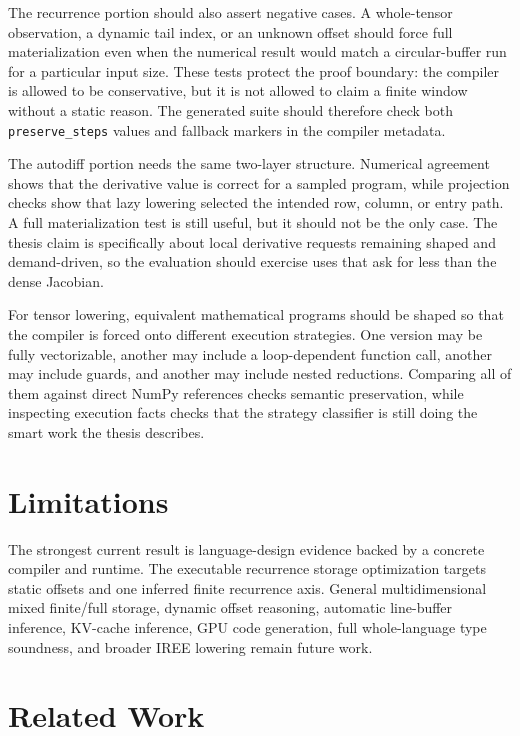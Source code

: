 The recurrence portion should also assert negative cases. A whole-tensor
observation, a dynamic tail index, or an unknown offset should force full
materialization even when the numerical result would match a circular-buffer
run for a particular input size. These tests protect the proof boundary: the
compiler is allowed to be conservative, but it is not allowed to claim a finite
window without a static reason. The generated suite should therefore check both
\texttt{preserve\_steps} values and fallback markers in the compiler metadata.

The autodiff portion needs the same two-layer structure. Numerical agreement
shows that the derivative value is correct for a sampled program, while
projection checks show that lazy lowering selected the intended row, column, or
entry path. A full materialization test is still useful, but it should not be
the only case. The thesis claim is specifically about local derivative requests
remaining shaped and demand-driven, so the evaluation should exercise uses that
ask for less than the dense Jacobian.

For tensor lowering, equivalent mathematical programs should be shaped so that
the compiler is forced onto different execution strategies. One version may be
fully vectorizable, another may include a loop-dependent function call, another
may include guards, and another may include nested reductions. Comparing all of
them against direct NumPy references checks semantic preservation, while
inspecting execution facts checks that the strategy classifier is still doing
the smart work the thesis describes.

\section{Limitations}

The strongest current result is language-design evidence backed by a concrete
compiler and runtime. The executable recurrence storage optimization targets
static offsets and one inferred finite recurrence axis. General
multidimensional mixed finite/full storage, dynamic offset reasoning,
automatic line-buffer inference, KV-cache inference, GPU code generation, full
whole-language type soundness, and broader IREE lowering remain future work.

\section{Related Work}

